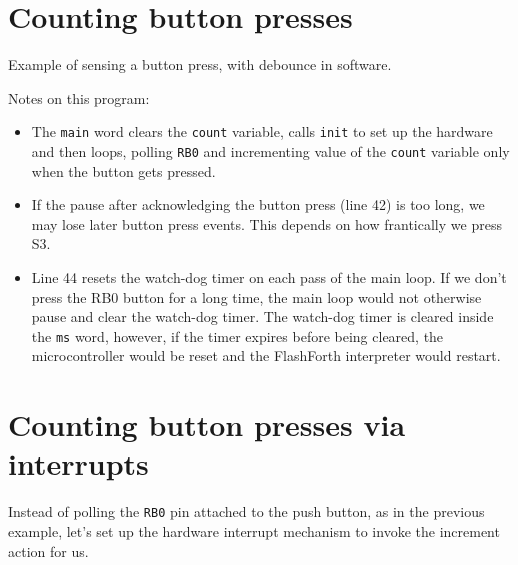 \documentclass[12pt,a4paper]{article}
\newcommand{\code}[2]{
 \hrulefill
 \scriptsize
 
 \hrulefill
 \vspace{2em}
 \normalsize
}
\begin{document}
\newpage
\section{Counting button presses}
%
Example of sensing a button press, with debounce in software.

\bigskip\noindent
\code{}{../pic18/push-button.txt}

\noindent
Notes on this program:
\begin{itemize}
  \item The \verb!main! word clears the \verb!count! variable, calls \verb!init! to set up the hardware
   and then loops, polling \verb!RB0! and incrementing value of the \verb!count! variable only when 
   the button gets pressed.
  \item If the pause after acknowledging the button press (line 42) is too long,
    we may lose later button press events.  
    This depends on how frantically we press S3.
  \item Line 44 resets the watch-dog timer on each pass of the main loop.
    If we don't press the RB0 button for a long time, the main loop would not otherwise pause 
    and clear the watch-dog timer.
    The watch-dog timer is cleared inside the \verb!ms! word, however,
    if the timer expires before being cleared, the microcontroller would be reset
    and the FlashForth interpreter would restart.    
\end{itemize}


\newpage
\section{Counting button presses via interrupts}
%
Instead of polling the \verb!RB0! pin attached to the push button, as in the previous example,
let's set up the hardware interrupt mechanism to invoke the increment action for us.

\bigskip\noindent
\code{}{../pic18/pb-interrupt.txt}
\end{document}
